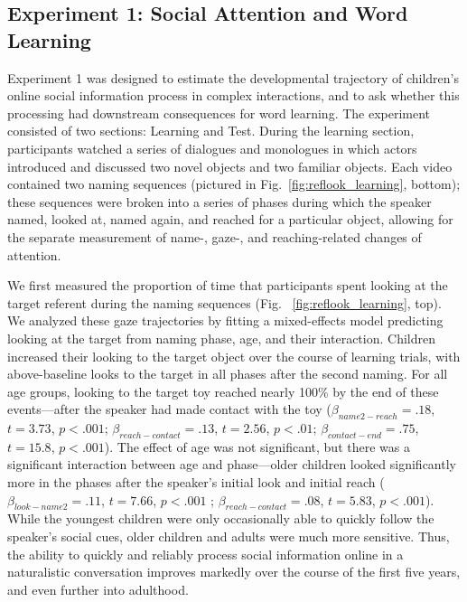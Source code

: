\documentclass{pnastwo}
\begin{document}
\begin{article}
\section{Experiment 1: Social Attention and Word Learning}

Experiment 1 was designed to estimate the developmental trajectory of children's online social information process in complex interactions, and to ask whether this processing had downstream consequences for word learning. The experiment consisted of two sections: Learning and Test. During the learning section, participants watched a series of dialogues and monologues in which actors introduced and discussed two novel objects and two familiar objects. Each video contained two naming sequences (pictured in Fig.~\ref{fig:reflook_learning}, bottom); these sequences were broken into a series of phases during which the speaker named, looked at, named again, and reached for a particular object, allowing for the separate measurement of name-, gaze-, and reaching-related changes of attention.

We first measured the proportion of time that participants spent looking at the target referent during the naming sequences (Fig. ~\ref{fig:reflook_learning}, top). We analyzed these gaze trajectories by fitting a mixed-effects model predicting looking at the target from naming phase, age, and their interaction. Children increased their looking to the target object over the course of learning trials, with above-baseline looks to the target in all phases after the second naming. For all age groups, looking to the target toy reached nearly 100\% by the end of these events---after the speaker had made contact with the toy ($\beta_{name2-reach} = .18$, $t = 3.73$, $p < .001$; $\beta_{reach-contact} = .13$, $t = 2.56$, $p < .01$; $\beta_{contact-end} = .75$, $t = 15.8$, $p < .001$). The effect of age was not significant, but there was a significant interaction between age and phase---older children looked significantly more in the phases after the speaker's initial look and initial reach ($\beta_{look-name2} = .11$, $t = 7.66$, $p < .001$ ; $\beta_{reach-contact} = .08$, $t = 5.83$, $p < .001$). While the youngest children were only occasionally able to quickly follow the speaker's social cues, older children and adults were much more sensitive. Thus, the ability to quickly and reliably process social information online in a naturalistic conversation improves markedly over the course of the first five years, and even further into adulthood.



\end{article}
\end{document}
